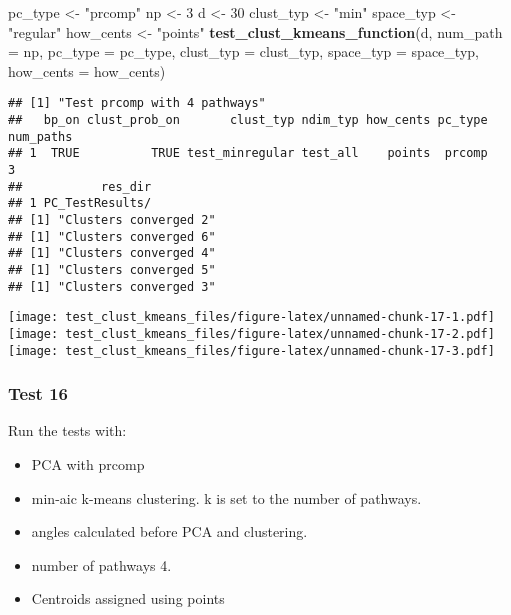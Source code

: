 \documentclass[
]{article}
\newenvironment{Shaded}{\begin{snugshade}}{\end{snugshade}}
\newcommand{\AttributeTok}[1]{\textcolor[rgb]{0.13,0.29,0.53}{#1}}
\newcommand{\DecValTok}[1]{\textcolor[rgb]{0.00,0.00,0.81}{#1}}
\newcommand{\FunctionTok}[1]{\textcolor[rgb]{0.13,0.29,0.53}{\textbf{#1}}}
\newcommand{\NormalTok}[1]{#1}
\newcommand{\OtherTok}[1]{\textcolor[rgb]{0.56,0.35,0.01}{#1}}
\newcommand{\StringTok}[1]{\textcolor[rgb]{0.31,0.60,0.02}{#1}}
\providecommand{\tightlist}{%
  \setlength{\itemsep}{0pt}\setlength{\parskip}{0pt}}
\begin{document}
\begin{Shaded}
\begin{Highlighting}[]
\NormalTok{pc\_type }\OtherTok{\textless{}{-}} \StringTok{"prcomp"}
\NormalTok{np }\OtherTok{\textless{}{-}} \DecValTok{3}
\NormalTok{d }\OtherTok{\textless{}{-}} \DecValTok{30}
\NormalTok{clust\_typ }\OtherTok{\textless{}{-}} \StringTok{"min"}
\NormalTok{space\_typ }\OtherTok{\textless{}{-}} \StringTok{"regular"}
\NormalTok{how\_cents }\OtherTok{\textless{}{-}} \StringTok{"points"}
\FunctionTok{test\_clust\_kmeans\_function}\NormalTok{(d,}
                           \AttributeTok{num\_path =}\NormalTok{ np,}
                           \AttributeTok{pc\_type =}\NormalTok{ pc\_type,}
                           \AttributeTok{clust\_typ =}\NormalTok{ clust\_typ,}
                           \AttributeTok{space\_typ =}\NormalTok{ space\_typ,}
                           \AttributeTok{how\_cents =}\NormalTok{ how\_cents)}
\end{Highlighting}
\end{Shaded}

\begin{verbatim}
## [1] "Test prcomp with 4 pathways"
##   bp_on clust_prob_on       clust_typ ndim_typ how_cents pc_type num_paths
## 1  TRUE          TRUE test_minregular test_all    points  prcomp         3
##           res_dir
## 1 PC_TestResults/
## [1] "Clusters converged 2"
## [1] "Clusters converged 6"
## [1] "Clusters converged 4"
## [1] "Clusters converged 5"
## [1] "Clusters converged 3"
\end{verbatim}

\texttt{[image: test\_clust\_kmeans\_files/figure-latex/unnamed-chunk-17-1.pdf]}
\texttt{[image: test\_clust\_kmeans\_files/figure-latex/unnamed-chunk-17-2.pdf]}
\texttt{[image: test\_clust\_kmeans\_files/figure-latex/unnamed-chunk-17-3.pdf]}

\hypertarget{test-16}{%
\subsubsection{Test 16}\label{test-16}}

Run the tests with:

\begin{itemize}
\tightlist
\item
  PCA with prcomp
\item
  min-aic k-means clustering. k is set to the number of pathways.
\item
  angles calculated before PCA and clustering.
\item
  number of pathways 4.
\item
  Centroids assigned using points
\end{itemize}
\end{document}
